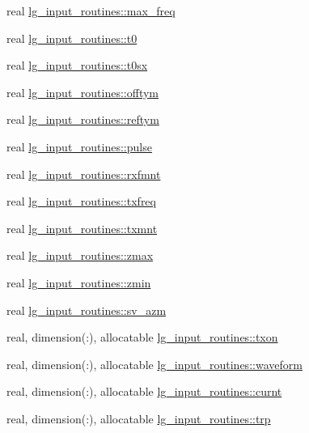 \begin{DoxyCompactItemize}
real \hyperlink{namespacelg__input__routines_a120729b828c4a5845b2e603f0428e70f}{lg\+\_\+input\+\_\+routines\+::max\+\_\+freq}
\item 
real \hyperlink{namespacelg__input__routines_a1d07f499782c7e039a64c0210710874d}{lg\+\_\+input\+\_\+routines\+::t0}
\item 
real \hyperlink{namespacelg__input__routines_a59d37d985b0dc7db54d499a25dfdd65a}{lg\+\_\+input\+\_\+routines\+::t0sx}
\item 
real \hyperlink{namespacelg__input__routines_a76c7f2e1e393a33879bfdb035696a0eb}{lg\+\_\+input\+\_\+routines\+::offtym}
\item 
real \hyperlink{namespacelg__input__routines_afb36965de38bb47f77fe472111c7f95e}{lg\+\_\+input\+\_\+routines\+::reftym}
\item 
real \hyperlink{namespacelg__input__routines_a35c66c7854d0833a99927cad810718ac}{lg\+\_\+input\+\_\+routines\+::pulse}
\item 
real \hyperlink{namespacelg__input__routines_a051730a5273ac4e6b567252982d44414}{lg\+\_\+input\+\_\+routines\+::rxfmnt}
\item 
real \hyperlink{namespacelg__input__routines_a47c11280e7113256e8989d445a3b205a}{lg\+\_\+input\+\_\+routines\+::txfreq}
\item 
real \hyperlink{namespacelg__input__routines_ab76d54fe813a2c75ec4592b67c1c96cc}{lg\+\_\+input\+\_\+routines\+::txmnt}
\item 
real \hyperlink{namespacelg__input__routines_a8ca869a698383a3684c6fdb425b6dd7c}{lg\+\_\+input\+\_\+routines\+::zmax}
\item 
real \hyperlink{namespacelg__input__routines_a75002fff3768fa349922c4691af835eb}{lg\+\_\+input\+\_\+routines\+::zmin}
\item 
real \hyperlink{namespacelg__input__routines_adf00d31a387ab979268c6e7173a1c781}{lg\+\_\+input\+\_\+routines\+::sv\+\_\+azm}
\item 
real, dimension(\+:), allocatable \hyperlink{namespacelg__input__routines_a9ea6fe9c73da602e7448aa2684a035fe}{lg\+\_\+input\+\_\+routines\+::txon}
\item 
real, dimension(\+:), allocatable \hyperlink{namespacelg__input__routines_a7966da9a09991ee20d62ae7374806c50}{lg\+\_\+input\+\_\+routines\+::waveform}
\item 
real, dimension(\+:), allocatable \hyperlink{namespacelg__input__routines_a2724872da9ddfe9b94de8c091b0a36dd}{lg\+\_\+input\+\_\+routines\+::curnt}
\item 
real, dimension(\+:), allocatable \hyperlink{namespacelg__input__routines_a664cea039ac7180e824012883beeb9fe}{lg\+\_\+input\+\_\+routines\+::trp}

\end{DoxyCompactItemize}
